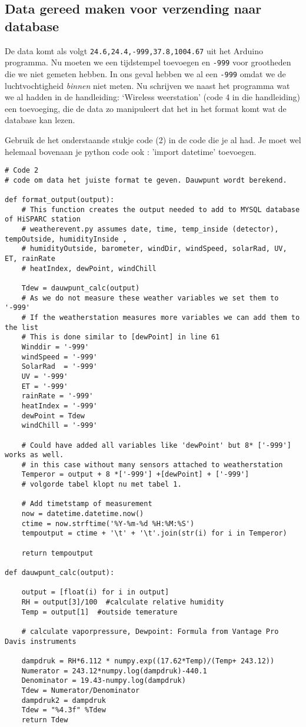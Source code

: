 \subsection{Data gereed maken voor verzending naar database}

De data komt als volgt \verb|24.6,24.4,-999,37.8,1004.67| uit het Arduino programma.
Nu moeten we een tijdstempel toevoegen en \verb|-999| voor grootheden die 
we niet gemeten hebben. In ons geval hebben we al een \verb|-999| omdat we de 
luchtvochtigheid \textit{binnen} niet meten.
Nu schrijven we naast het programma wat we al hadden in de handleiding: `Wireless
weerstation' (code 4 in die handleiding) een toevoeging, die de data zo manipuleert dat het in het 
format komt wat de \hisparc database kan lezen.

Gebruik de het onderstaande stukje code (2) in de code die je al had.
Je moet wel helemaal bovenaan je python code ook : 'import datetime' toevoegen.

\begin{verbatim}
# Code 2
# code om data het juiste format te geven. Dauwpunt wordt berekend.

def format_output(output):
    # This function creates the output needed to add to MYSQL database of HiSPARC station
    # weatherevent.py assumes date, time, temp_inside (detector), tempOutside, humidityInside ,
    # humidityOutside, barometer, windDir, windSpeed, solarRad, UV, ET, rainRate
    # heatIndex, dewPoint, windChill

    Tdew = dauwpunt_calc(output)
    # As we do not measure these weather variables we set them to '-999'
    # If the weatherstation measures more variables we can add them to the list
    # This is done similar to [dewPoint] in line 61
    Winddir = '-999'
    windSpeed = '-999'
    SolarRad  = '-999'
    UV = '-999'
    ET = '-999'
    rainRate = '-999'
    heatIndex = '-999'
    dewPoint = Tdew
    windChill = '-999'

    # Could have added all variables like 'dewPoint' but 8* ['-999'] works as well.
    # in this case without many sensors attached to weatherstation
    Temperor = output + 8 *['-999'] +[dewPoint] + ['-999'] 
    # volgorde tabel klopt nu met tabel 1.

    # Add timetstamp of measurement
    now = datetime.datetime.now()
    ctime = now.strftime('%Y-%m-%d %H:%M:%S')
    tempoutput = ctime + '\t' + '\t'.join(str(i) for i in Temperor)

    return tempoutput

def dauwpunt_calc(output):

    output = [float(i) for i in output]
    RH = output[3]/100  #calculate relative humidity
    Temp = output[1]  #outside temerature

    # calculate vaporpressure, Dewpoint: Formula from Vantage Pro Davis instruments

    dampdruk = RH*6.112 * numpy.exp((17.62*Temp)/(Temp+ 243.12))
    Numerator = 243.12*numpy.log(dampdruk)-440.1
    Denominator = 19.43-numpy.log(dampdruk)
    Tdew = Numerator/Denominator
    dampdruk2 = dampdruk
    Tdew = "%4.3f" %Tdew
    return Tdew

\end{verbatim}

